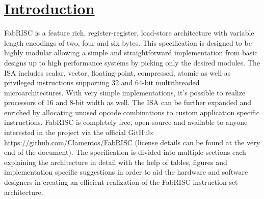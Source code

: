 \section[Introduction]{\LARGE\underline{Introduction}}

    \vspace{10pt}

    FabRISC is a feature rich, register-register, load-store architecture with variable length encodings of two, four and six bytes. This specification is designed to be highly modular allowing a simple and straightforward implementation from basic designs up to high performance systems by picking only the desired modules. The ISA includes scalar, vector, floating-point, compressed, atomic as well as privileged instructions supporting 32 and 64-bit multithreaded microarchitectures. With very simple implementations, it's possible to realize processors of 16 and 8-bit width as well. The ISA can be further expanded and enriched by allocating unused opcode combinations to custom application specific instructions. FabRISC is completely free, open-source and available to anyone interested in the project via the official GitHub: \url{https://github.com/Clamentos/FabRISC} (license details can be found at the very end of the document). The specification is divided into multiple sections each explaining the architecture in detail with the help of tables, figures and implementation specific suggestions in order to aid the hardware and software designers in creating an efficient realization of the FabRISC instruction set architecture.

